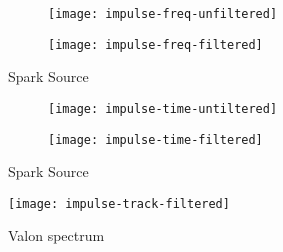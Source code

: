 \begin{figure}
  \centering
  \begin{subfigure}[b]{0.8\textwidth}
    \centering
    \texttt{[image: impulse-freq-unfiltered]}
  \end{subfigure}
  \begin{subfigure}[b]{0.8\textwidth}
    \centering
    \texttt{[image: impulse-freq-filtered]}
  \end{subfigure}
  \caption{Spark Source}
  \label{fig:field-trials:impulse-source-freq-filtering}
\end{figure}

\begin{figure}
  \centering
  \begin{subfigure}[b]{0.8\textwidth}
    \centering
    \texttt{[image: impulse-time-untiltered]}
  \end{subfigure}
  \begin{subfigure}[b]{0.8\textwidth}
    \centering
    \texttt{[image: impulse-time-filtered]}
  \end{subfigure}
  \caption{Spark Source}
  \label{fig:field-trials:impulse-source-freq-filtering}
\end{figure}

\begin{figure}
  \centering
  \texttt{[image: impulse-track-filtered]}
  \caption{Valon spectrum}
  \label{fig:field-trails:impulse-source-final-track}
\end{figure}
